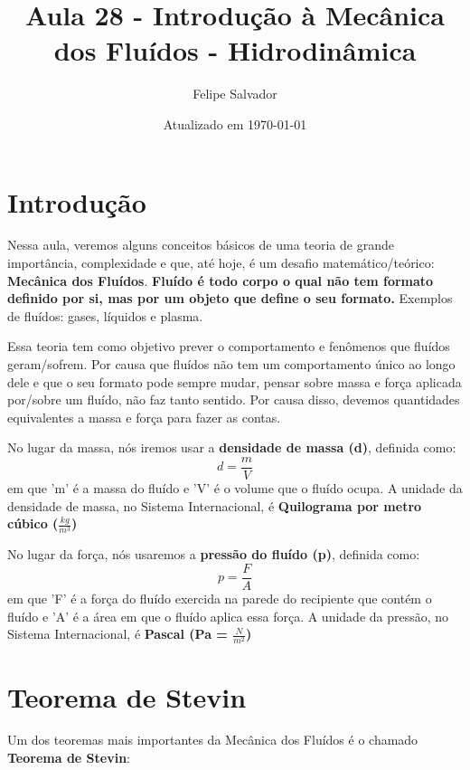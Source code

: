 \documentclass[12pt]{extarticle}
\title{Aula 28 - Introdução à Mecânica dos Fluídos - Hidrodinâmica}
\author{Felipe Salvador}
\date{Atualizado em \today}
\newcommand{\<}{\langle}
\renewcommand{\>}{\rangle}
\theoremstyle{definition}
\begin{document}
\maketitle

\section{Introdução}

Nessa aula, veremos alguns conceitos básicos de uma teoria de grande importância, complexidade e que, até hoje, é um desafio matemático/teórico: \textbf{Mecânica dos Fluídos}. \textbf{Fluído é todo corpo o qual não tem formato definido por si, mas por um objeto que define o seu formato.} Exemplos de fluídos: gases, líquidos e plasma.

Essa teoria tem como objetivo prever o comportamento e fenômenos que fluídos geram/sofrem. Por causa que fluídos não tem um comportamento único ao longo dele e que o seu formato pode sempre mudar, pensar sobre massa e força aplicada por/sobre um fluído, não faz tanto sentido. Por causa disso, devemos quantidades equivalentes a massa e força para fazer as contas.

No lugar da massa, nós iremos usar a \textbf{densidade de massa (d)}, definida como:
\begin{equation}
    d = \frac{m}{V}
\end{equation}
\noindent em que 'm' é a massa do fluído e 'V' é o volume que o fluído ocupa. A unidade da densidade de massa, no Sistema Internacional, é \textbf{Quilograma por metro cúbico ($\frac{kg}{m^3}$)}

No lugar da força, nós usaremos a \textbf{pressão do fluído (p)}, definida como:
\begin{equation}\label{eq:pressao}
    p = \frac{F}{A}
\end{equation}
\noindent em que 'F' é a força do fluído exercida na parede do recipiente que contém o fluído e 'A' é a área em que o fluído aplica essa força. A unidade da pressão, no Sistema Internacional, é \textbf{Pascal (Pa = $\frac{N}{m^2}$)}

\section{Teorema de Stevin}
Um dos teoremas mais importantes da Mecânica dos Fluídos é o chamado \textbf{Teorema de Stevin}: 
\end{document}
